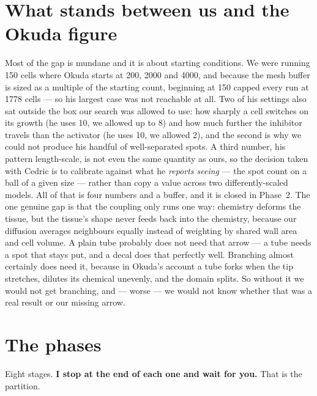 \documentclass[11pt,a4paper]{article}
\begin{document}
\section{What stands between us and the Okuda figure}\label{sec:okuda}

Most of the gap is mundane and it is about starting conditions. We were running 150 cells where
Okuda starts at 200, 2000 and 4000, and because the mesh buffer is sized as a multiple of the
starting count, beginning at 150 capped every run at 1778 cells --- so his largest case was not
reachable at all. Two of his settings also sat outside the box our search was allowed to use: how
sharply a cell switches on its growth (he uses 10, we allowed up to 8) and how much further the
inhibitor travels than the activator (he uses 10, we allowed 2), and the second is why we could not
produce his handful of well-separated spots. A third number, his pattern length-scale, is not even
the same quantity as ours, so the decision taken with Cedric is to calibrate against what he
\emph{reports seeing} --- the spot count on a ball of a given size --- rather than copy a value
across two differently-scaled models. All of that is four numbers and a buffer, and it is closed in
Phase~2. The one genuine gap is that the coupling only runs one way: chemistry deforms the tissue,
but the tissue's shape never feeds back into the chemistry, because our diffusion averages
neighbours equally instead of weighting by shared wall area and cell volume. A plain tube probably
does not need that arrow --- a tube needs a spot that stays put, and a decal does that perfectly
well. Branching almost certainly does need it, because in Okuda's account a tube forks when the tip
stretches, dilutes its chemical unevenly, and the domain splits. So without it we would not get
branching, and --- worse --- we would not know whether that was a real result or our missing arrow.

\section{The phases}

Eight stages. \textbf{I stop at the end of each one and wait for you.} That is the partition.
\end{document}
